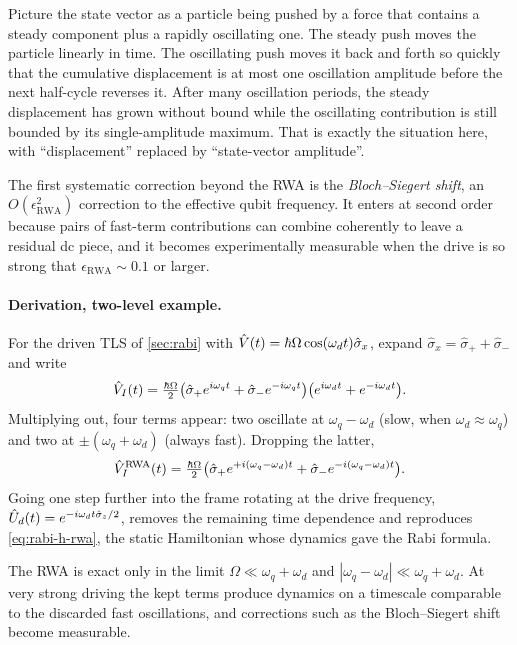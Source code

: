 \begin{intuition}
Picture the state vector as a particle being pushed by a force that
contains a steady component plus a rapidly oscillating one. The
steady push moves the particle linearly in time. The oscillating
push moves it back and forth so quickly that the cumulative
displacement is at most one oscillation amplitude before the next
half-cycle reverses it. After many oscillation periods, the
steady displacement has grown without bound while the oscillating
contribution is still bounded by its single-amplitude maximum.
That is exactly the situation here, with ``displacement''
replaced by ``state-vector amplitude''.
\end{intuition}

The first systematic correction beyond the RWA is the
\emph{Bloch--Siegert shift}, an $O(\epsilon_\text{RWA}^2)$
correction to the effective qubit frequency. It enters at second
order because pairs of fast-term contributions can combine
coherently to leave a residual dc piece, and it becomes
experimentally measurable when the drive is so strong that
$\epsilon_\text{RWA}\sim0.1$ or larger.

\paragraph{Derivation, two-level example.}
For the driven TLS of \cref{sec:rabi} with
$\hat{V}(t)=\hbar\Omega\cos(\omega_d t)\hat\sigma_x$, expand
$\hat\sigma_x=\hat\sigma_++\hat\sigma_-$ and write
\begin{equation}
\hat{V}_I(t) = \tfrac{\hbar\Omega}{2}\bigl(\hat\sigma_+ e^{i\omega_q t}+\hat\sigma_- e^{-i\omega_q t}\bigr)
\bigl(e^{i\omega_d t}+e^{-i\omega_d t}\bigr).
\end{equation}
Multiplying out, four terms appear: two oscillate at
$\omega_q-\omega_d$ (slow, when $\omega_d\approx\omega_q$) and two
at $\pm(\omega_q+\omega_d)$ (always fast). Dropping the latter,
\begin{equation}
\hat{V}_I^\text{RWA}(t)
= \tfrac{\hbar\Omega}{2}\bigl(\hat\sigma_+ e^{+i(\omega_q-\omega_d)t}+\hat\sigma_- e^{-i(\omega_q-\omega_d)t}\bigr).
\end{equation}
Going one step further into the frame rotating at the drive
frequency, $\hat{U}_d(t)=e^{-i\omega_d t\hat\sigma_z/2}$, removes the
remaining time dependence and reproduces \cref{eq:rabi-h-rwa}, the
static Hamiltonian whose dynamics gave the Rabi formula.

\begin{remark}[Validity]
The RWA is exact only in the limit
$\Omega\ll \omega_q+\omega_d$ and $|\omega_q-\omega_d|\ll\omega_q+\omega_d$.
At very strong driving the kept terms produce dynamics on a timescale
comparable to the discarded fast oscillations, and corrections such
as the Bloch--Siegert shift become measurable.
\end{remark}

